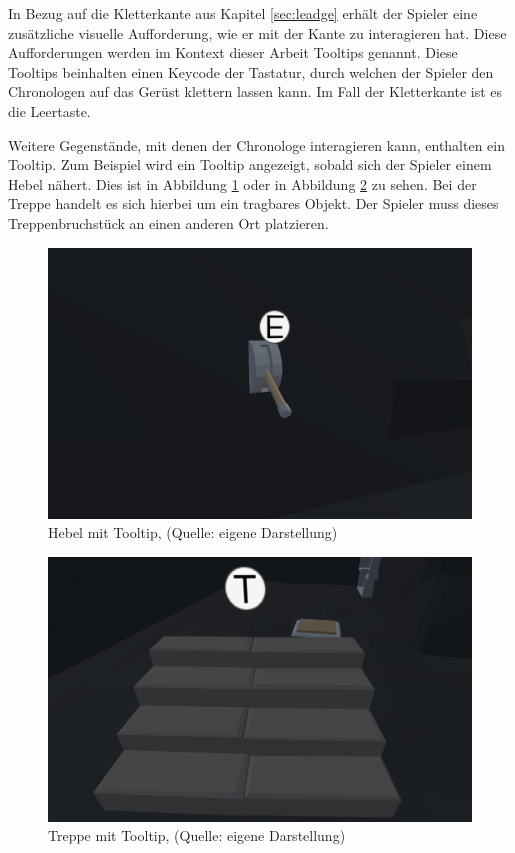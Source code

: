 In Bezug auf die Kletterkante aus Kapitel \ref{sec:leadge} erhält der Spieler eine zusätzliche visuelle Aufforderung, wie er mit der Kante zu interagieren hat. Diese Aufforderungen werden im Kontext dieser Arbeit Tooltips genannt. Diese Tooltips beinhalten einen Keycode der Tastatur, durch welchen der Spieler den Chronologen auf das Gerüst klettern lassen kann. Im Fall der Kletterkante ist es die Leertaste.

Weitere Gegenstände, mit denen der Chronologe interagieren kann, enthalten ein Tooltip. Zum Beispiel wird ein Tooltip angezeigt, sobald sich der Spieler einem Hebel nähert. Dies ist in Abbildung \ref{fig:lever_tooltip} oder in Abbildung \ref{fig:stair_tooltip} zu sehen. Bei der Treppe handelt es sich hierbei um ein tragbares Objekt. Der Spieler muss dieses Treppenbruchstück an einen anderen Ort platzieren.

\begin{figure}[ht]
\centering
\includegraphics[width=0.8\linewidth]{content/pictures/lever_tooltip.jpg}
\caption{Hebel mit Tooltip, (Quelle: eigene Darstellung)}
\label{fig:lever_tooltip}
\end{figure}

\begin{figure}[ht]
\centering
\includegraphics[width=0.8\linewidth]{content/pictures/carry_tooltip.jpg}
\caption{Treppe mit Tooltip, (Quelle: eigene Darstellung)}
\label{fig:stair_tooltip}
\end{figure}

